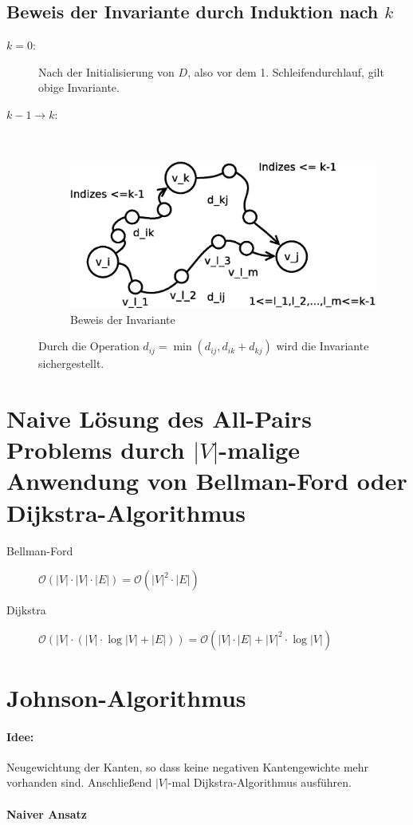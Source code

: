 \subsection{Beweis der Invariante durch Induktion nach $k$}
\begin{description}
\item[$k=0$:] Nach der Initialisierung von $D$, also vor dem 1. Schleifendurchlauf, gilt obige Invariante.
\item[$k-1\rightarrow k$:]$~$\\
\begin{figure}[H]
\centering
\includegraphics[width=0.5\linewidth]{18/Grafik/Diagramm2}
\caption{Beweis der Invariante}
\label{fig:Diagramm2}
\end{figure}
Durch die Operation $d_{ij} = \min(d_{ij}, d_{ik}+d_{kj})$ wird die Invariante sichergestellt.
\end{description}
\section[Naive Lösung]{Naive Lösung des All-Pairs Problems durch $|V|$-malige Anwendung von Bellman-Ford oder Dijkstra-Algorithmus}
\begin{description}
\item[Bellman-Ford] $\mathcal{O}(|V|\cdot|V|\cdot|E|) = \mathcal{O}(|V|^2\cdot|E|)$
\item[Dijkstra] $\mathcal{O}(|V|\cdot(|V|\cdot\log|V|+|E|)) = \mathcal{O}(|V|\cdot|E|+|V|^2\cdot\log|V|)$
\end{description}
\section{Johnson-Algorithmus}
\paragraph{Idee:} Neugewichtung der Kanten, so dass keine negativen Kantengewichte mehr vorhanden sind. Anschließend $|V|$-mal Dijkstra-Algorithmus ausführen.

\paragraph{Naiver Ansatz}$~~$\\

